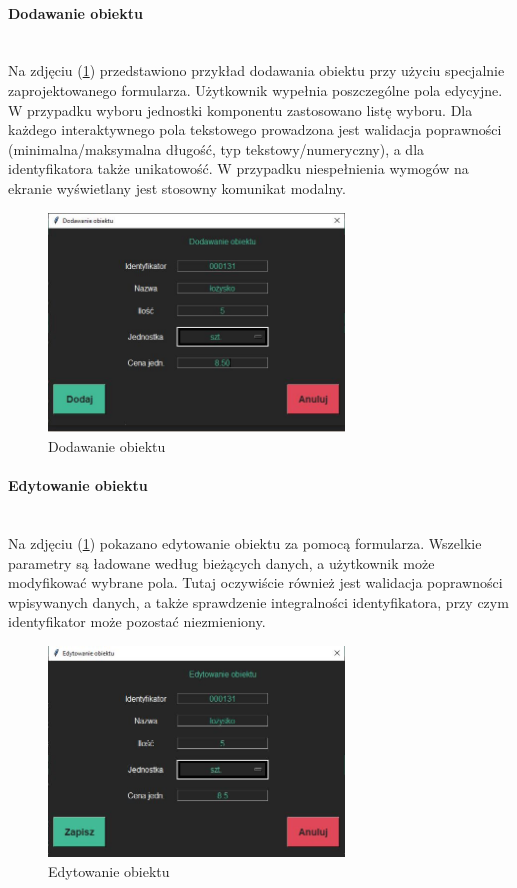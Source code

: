 \documentclass[12pt,twoside]{article}
\begin{document}
\paragraph*{Dodawanie obiektu}\mbox{}\\
Na zdjęciu (\ref{fig:app:bom_add_item}) przedstawiono przykład dodawania obiektu przy użyciu specjalnie zaprojektowanego formularza. Użytkownik wypełnia poszczególne pola edycyjne. W przypadku wyboru jednostki komponentu zastosowano listę wyboru. Dla każdego interaktywnego pola tekstowego prowadzona jest walidacja poprawności (minimalna/maksymalna długość, typ tekstowy/numeryczny), a dla identyfikatora także unikatowość. W przypadku niespełnienia wymogów na ekranie wyświetlany jest stosowny komunikat modalny.

\begin{figure}[H]
	\centering
	\includegraphics[width=0.7\textwidth]{figures/app/bom_add_item.jpg}
	\caption{Dodawanie obiektu}
\label{fig:app:bom_add_item}
\end{figure}

\paragraph*{Edytowanie obiektu}\mbox{}\\
Na zdjęciu (\ref{fig:app:bom_add_item}) pokazano edytowanie obiektu za pomocą formularza. Wszelkie parametry są ładowane według bieżących danych, a użytkownik może modyfikować wybrane pola. Tutaj oczywiście również jest walidacja poprawności wpisywanych danych, a także sprawdzenie integralności identyfikatora, przy czym identyfikator może pozostać niezmieniony. 

\begin{figure}[H]
	\centering
	\includegraphics[width=0.7\textwidth]{figures/app/bom_edit_item.jpg}
	\caption{Edytowanie obiektu}
\label{fig:app:bom_edit_item}
\end{figure}
\end{document}
